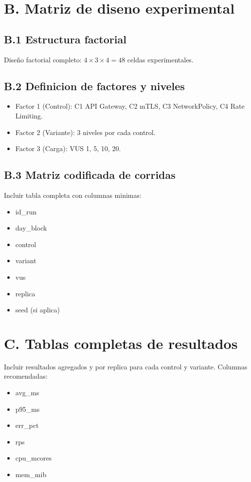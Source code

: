 \section{B. Matriz de diseno experimental}
\label{anx:matriz-diseno}

\subsection{B.1 Estructura factorial}
Dise\~no factorial completo: $4 \times 3 \times 4 = 48$ celdas experimentales.

\subsection{B.2 Definicion de factores y niveles}
\begin{itemize}
  \item Factor 1 (Control): C1 API Gateway, C2 mTLS, C3 NetworkPolicy, C4 Rate Limiting.
  \item Factor 2 (Variante): 3 niveles por cada control.
  \item Factor 3 (Carga): VUS 1, 5, 10, 20.
\end{itemize}

\subsection{B.3 Matriz codificada de corridas}
Incluir tabla completa con columnas minimas:
\begin{itemize}
  \item id\_run
  \item day\_block
  \item control
  \item variant
  \item vus
  \item replica
  \item seed (si aplica)
\end{itemize}

\section{C. Tablas completas de resultados}
\label{anx:tablas-resultados}

Incluir resultados agregados y por replica para cada control y variante. Columnas recomendadas:
\begin{itemize}
  \item avg\_ms
  \item p95\_ms
  \item err\_pct
  \item rps
  \item cpu\_mcores
  \item mem\_mib
\end{itemize}

